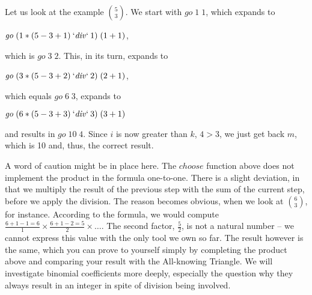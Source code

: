 \documentclass{scrreprt}
\newcommand{\Varid}[1]{\mathit{#1}}
\begin{document}
Let us look at the example $\binom{5}{3}$.
We start with \ensuremath{\Varid{go}\;\mathrm{1}\;\mathrm{1}}, which expands to

\ensuremath{\Varid{go}\;(\mathrm{1}\mathbin{*}(\mathrm{5}\mathbin{-}\mathrm{3}\mathbin{+}\mathrm{1})\mathbin{\Varid{`div`}}\mathrm{1})\;(\mathrm{1}\mathbin{+}\mathrm{1})},

which is \ensuremath{\Varid{go}\;\mathrm{3}\;\mathrm{2}}.
This, in its turn, expands to 

\ensuremath{\Varid{go}\;(\mathrm{3}\mathbin{*}(\mathrm{5}\mathbin{-}\mathrm{3}\mathbin{+}\mathrm{2})\mathbin{\Varid{`div`}}\mathrm{2})\;(\mathrm{2}\mathbin{+}\mathrm{1})},

which equals \ensuremath{\Varid{go}\;\mathrm{6}\;\mathrm{3}}, expands to

\ensuremath{\Varid{go}\;(\mathrm{6}\mathbin{*}(\mathrm{5}\mathbin{-}\mathrm{3}\mathbin{+}\mathrm{3})\mathbin{\Varid{`div`}}\mathrm{3})\;(\mathrm{3}\mathbin{+}\mathrm{1})}

and results in \ensuremath{\Varid{go}\;\mathrm{10}\;\mathrm{4}}.
Since $i$ is now greater than $k$, $4 > 3$,
we just get back $m$, which is 10 and, thus, the correct result.

A word of caution might be in place here.
The $choose$ function above
does not implement the product in the formula
one-to-one.
There is a slight deviation,
in that we multiply the result of the previous step
with the sum of the current step,
before we apply the division.
The reason becomes obvious,
when we look at $\binom{6}{3}$, for instance.
According to the formula,
we would compute 
$\frac{6 + 1 - 1 = 6}{1} \times
 \frac{6 + 1 - 2 = 5}{2} \times \dots$.
The second factor, $\frac{5}{2}$,
is not a natural number --
we cannot express this value with 
the only tool we own so far.
The result however is the same,
which you can prove to yourself
simply by completing the product above
and comparing your result with the All-knowing Triangle.
We will investigate binomial coefficients
more deeply, especially the question
why they always result in an integer
in spite of division being involved.

\end{document}
